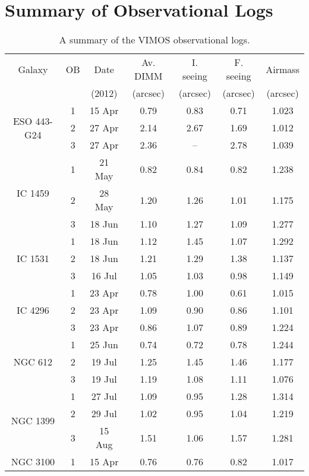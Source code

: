 \chapter{Summary of Observational Logs}

\begin{table}
	\centering
\begin{threeparttable}
	\caption{A summary of the VIMOS observational logs.}
	\label{tab:observations} 
	\begin{tabular}{c c c c c c c}
	\hline
	\hline
		Galaxy 	& OB  & Date  & Av. DIMM & I. seeing & F. seeing & Airmass \\
		& & (2012) & (arcsec) & (arcsec) & (arcsec) & (arcsec) \\
	\hline
		\multirow{3}{*}{ESO 443-G24}& 1 & 15 Apr & 0.79 & 0.83 & 0.71 & 1.023 \\
		& 2 & 27 Apr & 2.14 & 2.67 & 1.69 & 1.012 \\
		& 3 & 27 Apr  & 2.36 & --\tnote{a} & 2.78 & 1.039 \\
	\hline
		\multirow{3}{*}{IC 1459}& 1 & 21 May & 0.82 & 0.84 & 0.82 & 1.238 \\
		& 2 & 28 May & 1.20 & 1.26 & 1.01 & 1.175 \\
		& 3 & 18 Jun  & 1.10 & 1.27 & 1.09 & 1.277 \\
	\hline
		\multirow{3}{*}{IC 1531}& 1 & 18 Jun & 1.12 & 1.45 & 1.07 & 1.292 \\
		& 2 & 18 Jun & 1.21 & 1.29 & 1.38 & 1.137 \\
		& 3 & 16 Jul  & 1.05 & 1.03 & 0.98 & 1.149 \\
	\hline
		\multirow{3}{*}{IC 4296}& 1 & 23 Apr & 0.78 & 1.00 & 0.61 & 1.015 \\
		& 2 & 23 Apr & 1.09 & 0.90 & 0.86 & 1.101 \\
		& 3 & 23 Apr  & 0.86 & 1.07 & 0.89 & 1.224 \\
	\hline
		\multirow{3}{*}{NGC 612}& 1 & 25 Jun & 0.74 & 0.72 & 0.78 & 1.244 \\
		& 2 & 19 Jul & 1.25 & 1.45 & 1.46 & 1.177 \\
		& 3 & 19 Jul  & 1.19 & 1.08 & 1.11 & 1.076 \\
	\hline
		\multirow{3}{*}{NGC 1399}& 1 & 27 Jul & 1.09 & 0.95 & 1.28 & 1.314 \\
		& 2 & 29 Jul & 1.02 & 0.95 & 1.04 & 1.219 \\
		& 3 & 15 Aug  & 1.51 & 1.06 & 1.57 & 1.281 \\
	\hline
		\multirow{3}{*}{NGC 3100}& 1 & 15 Apr & 0.76 & 0.76 & 0.82 & 1.017 \\

\end{tabular}
\end{threeparttable}
\end{table}
